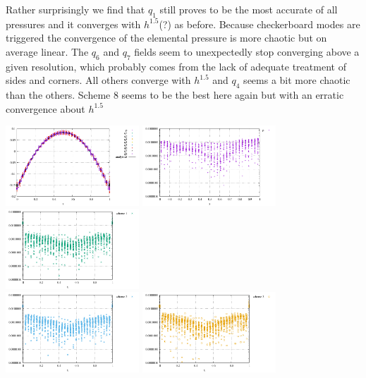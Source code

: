 Rather surprisingly we find that $q_1$ still proves to be the most accurate of all pressures and it converges
with $h^{1.5}$(?) as before. Because checkerboard modes are triggered the convergence of the elemental 
pressure is more chaotic but on average linear. 
The $q_6$ and $q_7$ fields seem to unexpectedly stop converging above a given resolution, which 
probably comes from the lack of adequate treatment of sides and corners.
All others converge with $h^{1.5}$ and $q_4$ seems a bit more chaotic than the others.
Scheme 8 seems to be the best here again but with an erratic convergence about $h^{1.5}$

\begin{center}
\includegraphics[width=5cm]{python_codes/fieldstone_12/results/rand/pressure}
\includegraphics[width=5cm]{python_codes/fieldstone_12/results/rand/p_error}
\includegraphics[width=5cm]{python_codes/fieldstone_12/results/rand/q1_error}\\
\includegraphics[width=5cm]{python_codes/fieldstone_12/results/rand/q2_error}
\includegraphics[width=5cm]{python_codes/fieldstone_12/results/rand/q3_error}

\end{center}
